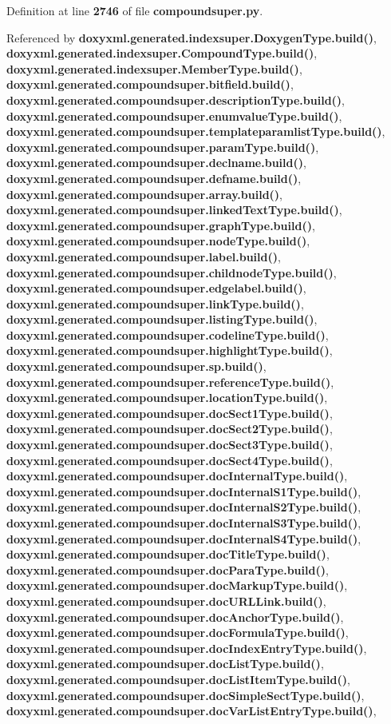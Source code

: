 Definition at line {\bf 2746} of file {\bf compoundsuper.\+py}.



Referenced by {\bf doxyxml.\+generated.\+indexsuper.\+Doxygen\+Type.\+build()}, {\bf doxyxml.\+generated.\+indexsuper.\+Compound\+Type.\+build()}, {\bf doxyxml.\+generated.\+indexsuper.\+Member\+Type.\+build()}, {\bf doxyxml.\+generated.\+compoundsuper.\+bitfield.\+build()}, {\bf doxyxml.\+generated.\+compoundsuper.\+description\+Type.\+build()}, {\bf doxyxml.\+generated.\+compoundsuper.\+enumvalue\+Type.\+build()}, {\bf doxyxml.\+generated.\+compoundsuper.\+templateparamlist\+Type.\+build()}, {\bf doxyxml.\+generated.\+compoundsuper.\+param\+Type.\+build()}, {\bf doxyxml.\+generated.\+compoundsuper.\+declname.\+build()}, {\bf doxyxml.\+generated.\+compoundsuper.\+defname.\+build()}, {\bf doxyxml.\+generated.\+compoundsuper.\+array.\+build()}, {\bf doxyxml.\+generated.\+compoundsuper.\+linked\+Text\+Type.\+build()}, {\bf doxyxml.\+generated.\+compoundsuper.\+graph\+Type.\+build()}, {\bf doxyxml.\+generated.\+compoundsuper.\+node\+Type.\+build()}, {\bf doxyxml.\+generated.\+compoundsuper.\+label.\+build()}, {\bf doxyxml.\+generated.\+compoundsuper.\+childnode\+Type.\+build()}, {\bf doxyxml.\+generated.\+compoundsuper.\+edgelabel.\+build()}, {\bf doxyxml.\+generated.\+compoundsuper.\+link\+Type.\+build()}, {\bf doxyxml.\+generated.\+compoundsuper.\+listing\+Type.\+build()}, {\bf doxyxml.\+generated.\+compoundsuper.\+codeline\+Type.\+build()}, {\bf doxyxml.\+generated.\+compoundsuper.\+highlight\+Type.\+build()}, {\bf doxyxml.\+generated.\+compoundsuper.\+sp.\+build()}, {\bf doxyxml.\+generated.\+compoundsuper.\+reference\+Type.\+build()}, {\bf doxyxml.\+generated.\+compoundsuper.\+location\+Type.\+build()}, {\bf doxyxml.\+generated.\+compoundsuper.\+doc\+Sect1\+Type.\+build()}, {\bf doxyxml.\+generated.\+compoundsuper.\+doc\+Sect2\+Type.\+build()}, {\bf doxyxml.\+generated.\+compoundsuper.\+doc\+Sect3\+Type.\+build()}, {\bf doxyxml.\+generated.\+compoundsuper.\+doc\+Sect4\+Type.\+build()}, {\bf doxyxml.\+generated.\+compoundsuper.\+doc\+Internal\+Type.\+build()}, {\bf doxyxml.\+generated.\+compoundsuper.\+doc\+Internal\+S1\+Type.\+build()}, {\bf doxyxml.\+generated.\+compoundsuper.\+doc\+Internal\+S2\+Type.\+build()}, {\bf doxyxml.\+generated.\+compoundsuper.\+doc\+Internal\+S3\+Type.\+build()}, {\bf doxyxml.\+generated.\+compoundsuper.\+doc\+Internal\+S4\+Type.\+build()}, {\bf doxyxml.\+generated.\+compoundsuper.\+doc\+Title\+Type.\+build()}, {\bf doxyxml.\+generated.\+compoundsuper.\+doc\+Para\+Type.\+build()}, {\bf doxyxml.\+generated.\+compoundsuper.\+doc\+Markup\+Type.\+build()}, {\bf doxyxml.\+generated.\+compoundsuper.\+doc\+U\+R\+L\+Link.\+build()}, {\bf doxyxml.\+generated.\+compoundsuper.\+doc\+Anchor\+Type.\+build()}, {\bf doxyxml.\+generated.\+compoundsuper.\+doc\+Formula\+Type.\+build()}, {\bf doxyxml.\+generated.\+compoundsuper.\+doc\+Index\+Entry\+Type.\+build()}, {\bf doxyxml.\+generated.\+compoundsuper.\+doc\+List\+Type.\+build()}, {\bf doxyxml.\+generated.\+compoundsuper.\+doc\+List\+Item\+Type.\+build()}, {\bf doxyxml.\+generated.\+compoundsuper.\+doc\+Simple\+Sect\+Type.\+build()}, {\bf doxyxml.\+generated.\+compoundsuper.\+doc\+Var\+List\+Entry\+Type.\+build()}, 